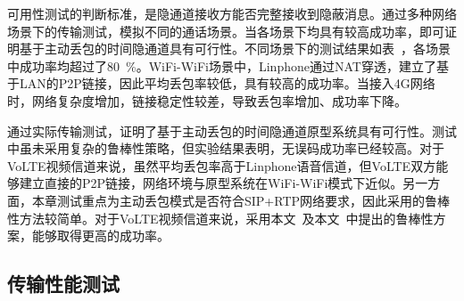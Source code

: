 
可用性测试的判断标准，是隐通道接收方能否完整接收到隐蔽消息。通过多种网络场景下的传输测试，模拟不同的通话场景。当各场景下均具有较高成功率，即可证明基于主动丢包的时间隐通道具有可行性。不同场景下的测试结果如表\ ，各场景中成功率均超过了{80\ \%}。WiFi-WiFi场景中，Linphone通过NAT穿透，建立了基于LAN的P2P链接，因此平均丢包率较低，具有较高的成功率。当接入4G网络时，网络复杂度增加，链接稳定性较差，导致丢包率增加、成功率下降。

通过实际传输测试，证明了基于主动丢包的时间隐通道原型系统具有可行性。测试中虽未采用复杂的鲁棒性策略，但实验结果表明，无误码成功率已经较高。对于VoLTE视频信道来说，虽然平均丢包率高于Linphone语音信道，但VoLTE双方能够建立直接的P2P链接，网络环境与原型系统在WiFi-WiFi模式下近似。另一方面，本章测试重点为主动丢包模式是否符合SIP+RTP网络要求，因此采用的鲁棒性方法较简单。对于VoLTE视频信道来说，采用本文\ 及本文\ 中提出的鲁棒性方案，能够取得更高的成功率。

\subsection{传输性能测试}
\label{chap:linphone:result:throughput}

